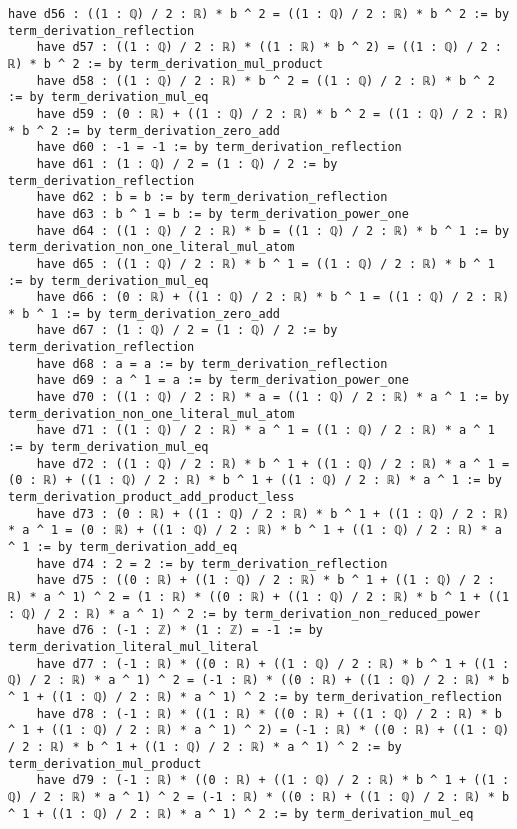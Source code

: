 \documentclass{article}
\begin{document}
\begin{tcolorbox}[colback=white!10, width=\linewidth]
\begin{lstlisting}[language=Lean4]
    have d56 : ((1 : ℚ) / 2 : ℝ) * b ^ 2 = ((1 : ℚ) / 2 : ℝ) * b ^ 2 := by term_derivation_reflection
    have d57 : ((1 : ℚ) / 2 : ℝ) * ((1 : ℝ) * b ^ 2) = ((1 : ℚ) / 2 : ℝ) * b ^ 2 := by term_derivation_mul_product
    have d58 : ((1 : ℚ) / 2 : ℝ) * b ^ 2 = ((1 : ℚ) / 2 : ℝ) * b ^ 2 := by term_derivation_mul_eq
    have d59 : (0 : ℝ) + ((1 : ℚ) / 2 : ℝ) * b ^ 2 = ((1 : ℚ) / 2 : ℝ) * b ^ 2 := by term_derivation_zero_add
    have d60 : -1 = -1 := by term_derivation_reflection
    have d61 : (1 : ℚ) / 2 = (1 : ℚ) / 2 := by term_derivation_reflection
    have d62 : b = b := by term_derivation_reflection
    have d63 : b ^ 1 = b := by term_derivation_power_one
    have d64 : ((1 : ℚ) / 2 : ℝ) * b = ((1 : ℚ) / 2 : ℝ) * b ^ 1 := by term_derivation_non_one_literal_mul_atom
    have d65 : ((1 : ℚ) / 2 : ℝ) * b ^ 1 = ((1 : ℚ) / 2 : ℝ) * b ^ 1 := by term_derivation_mul_eq
    have d66 : (0 : ℝ) + ((1 : ℚ) / 2 : ℝ) * b ^ 1 = ((1 : ℚ) / 2 : ℝ) * b ^ 1 := by term_derivation_zero_add
    have d67 : (1 : ℚ) / 2 = (1 : ℚ) / 2 := by term_derivation_reflection
    have d68 : a = a := by term_derivation_reflection
    have d69 : a ^ 1 = a := by term_derivation_power_one
    have d70 : ((1 : ℚ) / 2 : ℝ) * a = ((1 : ℚ) / 2 : ℝ) * a ^ 1 := by term_derivation_non_one_literal_mul_atom
    have d71 : ((1 : ℚ) / 2 : ℝ) * a ^ 1 = ((1 : ℚ) / 2 : ℝ) * a ^ 1 := by term_derivation_mul_eq
    have d72 : ((1 : ℚ) / 2 : ℝ) * b ^ 1 + ((1 : ℚ) / 2 : ℝ) * a ^ 1 = (0 : ℝ) + ((1 : ℚ) / 2 : ℝ) * b ^ 1 + ((1 : ℚ) / 2 : ℝ) * a ^ 1 := by term_derivation_product_add_product_less
    have d73 : (0 : ℝ) + ((1 : ℚ) / 2 : ℝ) * b ^ 1 + ((1 : ℚ) / 2 : ℝ) * a ^ 1 = (0 : ℝ) + ((1 : ℚ) / 2 : ℝ) * b ^ 1 + ((1 : ℚ) / 2 : ℝ) * a ^ 1 := by term_derivation_add_eq
    have d74 : 2 = 2 := by term_derivation_reflection
    have d75 : ((0 : ℝ) + ((1 : ℚ) / 2 : ℝ) * b ^ 1 + ((1 : ℚ) / 2 : ℝ) * a ^ 1) ^ 2 = (1 : ℝ) * ((0 : ℝ) + ((1 : ℚ) / 2 : ℝ) * b ^ 1 + ((1 : ℚ) / 2 : ℝ) * a ^ 1) ^ 2 := by term_derivation_non_reduced_power
    have d76 : (-1 : ℤ) * (1 : ℤ) = -1 := by term_derivation_literal_mul_literal
    have d77 : (-1 : ℝ) * ((0 : ℝ) + ((1 : ℚ) / 2 : ℝ) * b ^ 1 + ((1 : ℚ) / 2 : ℝ) * a ^ 1) ^ 2 = (-1 : ℝ) * ((0 : ℝ) + ((1 : ℚ) / 2 : ℝ) * b ^ 1 + ((1 : ℚ) / 2 : ℝ) * a ^ 1) ^ 2 := by term_derivation_reflection
    have d78 : (-1 : ℝ) * ((1 : ℝ) * ((0 : ℝ) + ((1 : ℚ) / 2 : ℝ) * b ^ 1 + ((1 : ℚ) / 2 : ℝ) * a ^ 1) ^ 2) = (-1 : ℝ) * ((0 : ℝ) + ((1 : ℚ) / 2 : ℝ) * b ^ 1 + ((1 : ℚ) / 2 : ℝ) * a ^ 1) ^ 2 := by term_derivation_mul_product
    have d79 : (-1 : ℝ) * ((0 : ℝ) + ((1 : ℚ) / 2 : ℝ) * b ^ 1 + ((1 : ℚ) / 2 : ℝ) * a ^ 1) ^ 2 = (-1 : ℝ) * ((0 : ℝ) + ((1 : ℚ) / 2 : ℝ) * b ^ 1 + ((1 : ℚ) / 2 : ℝ) * a ^ 1) ^ 2 := by term_derivation_mul_eq

\end{lstlisting}
\end{tcolorbox}
\end{document}
